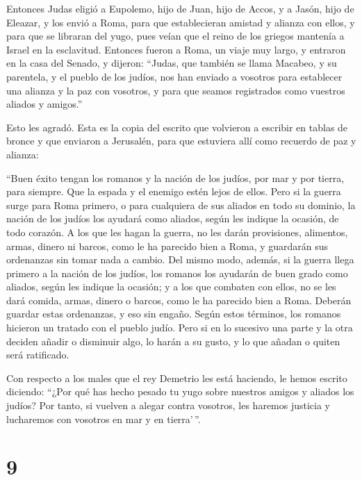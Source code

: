  Entonces Judas eligió a Eupolemo, hijo de Juan, hijo de
Accos, y a Jasón, hijo de Eleazar, y los envió a Roma, para que
establecieran amistad y alianza con ellos,  y para que se
libraran del yugo, pues veían que el reino de los griegos mantenía a
Israel en la esclavitud.  Entonces fueron a Roma, un
viaje muy largo, y entraron en la casa del Senado, y dijeron:
 ``Judas, que también se llama Macabeo, y su parentela, y
el pueblo de los judíos, nos han enviado a vosotros para establecer una
alianza y la paz con vosotros, y para que seamos registrados como
vuestros aliados y amigos.''

 Esto les agradó.  Esta es la copia del
escrito que volvieron a escribir en tablas de bronce y que enviaron a
Jerusalén, para que estuviera allí como recuerdo de paz y alianza:

 ``Buen éxito tengan los romanos y la nación de los
judíos, por mar y por tierra, para siempre. Que la espada y el enemigo
estén lejos de ellos.  Pero si la guerra surge para Roma
primero, o para cualquiera de sus aliados en todo su dominio,
 la nación de los judíos los ayudará como aliados, según
les indique la ocasión, de todo corazón.  A los que les
hagan la guerra, no les darán provisiones, alimentos, armas, dinero ni
barcos, como le ha parecido bien a Roma, y guardarán sus ordenanzas sin
tomar nada a cambio.  Del mismo modo, además, si la
guerra llega primero a la nación de los judíos, los romanos los ayudarán
de buen grado como aliados, según les indique la ocasión;
 y a los que combaten con ellos, no se les dará comida,
armas, dinero o barcos, como le ha parecido bien a Roma. Deberán guardar
estas ordenanzas, y eso sin engaño.  Según estos
términos, los romanos hicieron un tratado con el pueblo judío.
 Pero si en lo sucesivo una parte y la otra deciden
añadir o disminuir algo, lo harán a su gusto, y lo que añadan o quiten
será ratificado.

 Con respecto a los males que el rey Demetrio les está
haciendo, le hemos escrito diciendo: ``¿Por qué has hecho pesado tu yugo
sobre nuestros amigos y aliados los judíos?  Por tanto,
si vuelven a alegar contra vosotros, les haremos justicia y lucharemos
con vosotros en mar y en tierra'\,''.

\hypertarget{section-8}{%
\section{9}\label{section-8}}

